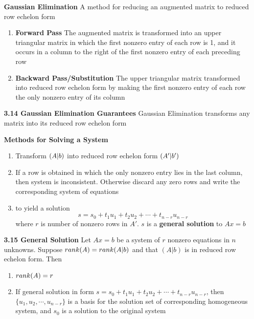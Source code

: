 \documentclass[11pt]{article}
\begin{document}
\begin{defn*}
    \textbf{Gaussian Elimination} A method for reducing an augmented matrix to reduced row echelon form 
    \begin{enumerate}
        \item \textbf{Forward Pass} The augmented matrix is transformed into an upper triangular matrix in which the first nonzero entry of each row is 1, and it occurs in a column to the right of the first nonzero entry of each preceding row 
        \item \textbf{Backward Pass/Substitution}  The upper triangular matrix transformed into reduced row echelon form by making the first nonzero entry of each row the only nonzero entry of its column
    \end{enumerate}
\end{defn*}

\begin{theorem*}
    \textbf{3.14 Gaussian Elimination Guarantees} Gaussian Elimination transforms any matrix into its reduced row echelon form
\end{theorem*}


\begin{defn*}
    \textbf{Methods for Solving a System}\\
    \begin{enumerate}
        \item Transform $(A|b)$ into reduced row echelon form $(A'|b')$
        \item If a row is obtained in which the only nonzero entry lies in the last column, then system is inconsistent. Otherwise discard any zero rows and write the corresponding system of equations 
        \item {} to yield a solution 
        \[
            s = s_0 + t_1u_1 + t_2u_2 + \cdots + t_{n-r}u_{n-r}    
        \]
        where $r$ is number of nonzero rows in $A'$. $s$ is a \textbf{general solution} to $Ax=b$
    \end{enumerate}
\end{defn*}

\begin{theorem*}
    \textbf{3.15 General Solution} Let $Ax=b$ be a system of $r$ nonzero equations in $n$ unknowns. Suppose $rank(A) = rank(A|b)$ and that $(A|b)$ is in reduced row echelon form. Then 
    \begin{enumerate}
        \item $rank(A)=r$
        \item If general solution in form $s = s_0 + t_1u_1 + t_2u_2 + \cdots + t_{n-r}u_{n-r}$, then $\{u_1,u_2, \cdots, u_{n-r}\}$ is a basis for the solution set of corresponding homogeneous system, and $s_0$ is a solution to the original system
    \end{enumerate}
\end{theorem*}
\end{document}
